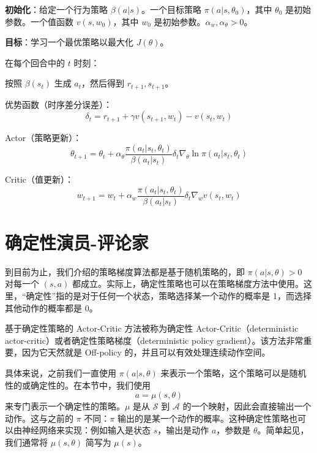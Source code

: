 \begin{algo}\label{alg:rl-ac-offpolicy}
\textbf{初始化}：给定一个行为策略 $\beta(a | s)$。一个目标策略 $\pi(a | s, \theta_{0})$，其中 $\theta_{0}$ 是初始参数。一个值函数 $v(s, w_{0})$，其中 $w_{0}$ 是初始参数。$\alpha_{w}, \alpha_{\theta} > 0$。

\textbf{目标}：学习一个最优策略以最大化 $J(\theta)$。

在每个回合中的 $t$ 时刻：

\quad 按照 $\beta(s_{t})$ 生成 $a_{t}$，然后得到 $r_{t+1}, s_{t+1}$。

\quad 优势函数（时序差分误差）：
\[
\delta_{t} = r_{t+1} + \gamma v(s_{t+1}, w_{t}) - v(s_{t}, w_{t})
\]

\quad Actor（策略更新）：
\[
\theta_{t+1} = \theta_{t} + \alpha_{\theta} \frac{\pi(a_{t} | s_{t}, \theta_{t})}{\beta(a_{t} | s_{t})} \delta_{t} \nabla_{\theta} \ln \pi(a_{t} | s_{t}, \theta_{t})
\]

\quad Critic（值更新）：
\[
w_{t+1} = w_{t} + \alpha_{w} \frac{\pi(a_{t} | s_{t}, \theta_{t})}{\beta(a_{t} | s_{t})} \delta_{t} \nabla_{w} v(s_{t}, w_{t})
\]
\end{algo}

\section{确定性演员-评论家}
\label{sec:rl-ac-deterministic}

到目前为止，我们介绍的策略梯度算法都是基于随机策略的，即 $\pi(a | s, \theta) > 0$ 对每一个 $(s, a)$ 都成立。实际上，确定性策略也可以在策略梯度方法中使用。这里，“确定性”指的是对于任何一个状态，策略选择某一个动作的概率是 1，而选择其他动作的概率都是 0。

基于确定性策略的 Actor-Critic 方法被称为确定性 Actor-Critic（deterministic actor-critic）或者确定性策略梯度（deterministic policy gradient）。该方法非常重要，因为它天然就是 Off-policy 的，并且可以有效处理连续动作空间。

具体来说，之前我们一直使用 $\pi(a | s, \theta)$ 来表示一个策略，这个策略可以是随机性的或确定性的。在本节中，我们使用
\[
a = \mu(s, \theta)
\]
来专门表示一个确定性的策略。$\mu$ 是从 $\mathcal{S}$ 到 $\mathcal{A}$ 的一个映射，因此会直接输出一个动作。这与之前的 $\pi$ 不同：$\pi$ 输出的是某一个动作的概率。这种确定性策略也可以由神经网络来实现：例如输入是状态 $s$，输出是动作 $a$，参数是 $\theta$。简单起见，我们通常将 $\mu(s, \theta)$ 简写为 $\mu(s)$。


